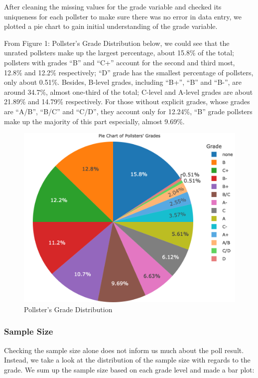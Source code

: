 \documentclass[
  12pt,
]{article}
\begin{document}
After cleaning the missing values for the grade variable and checked its
uniqueness for each pollster to make sure there was no error in data
entry, we plotted a pie chart to gain initial understanding of the grade
variable.

From Figure 1: Pollster's Grade Distribution below, we could see that
the unrated pollsters make up the largest percentage, about 15.8\% of
the total; pollsters with grades ``B'' and ``C+'' account for the second
and third most, 12.8\% and 12.2\% respectively; ``D'' grade has the
smallest percentage of pollsters, only about 0.51\%. Besides, B-level
grades, including ``B+'', ``B'' and ``B-'', are around 34.7\%, almost
one-third of the total; C-level and A-level grades are about 21.89\% and
14.79\% respectively. For those without explicit grades, whose grades
are ``A/B'', ``B/C'' and ``C/D'', they account only for 12.24\%, ``B''
grade pollsters make up the majority of this part especially, almost
9.69\%.

\begin{figure}
\centering
\includegraphics[width=\textwidth,height=0.3\textheight]{./Figures/piechart.png}
\caption{Pollster's Grade Distribution}
\end{figure}

\hypertarget{sample-size}{%
\subsubsection{Sample Size}\label{sample-size}}

Checking the sample size alone does not inform us much about the poll
result. Instead, we take a look at the distribution of the sample size
with regards to the grade. We sum up the sample size based on each grade
level and made a bar plot:
\end{document}
